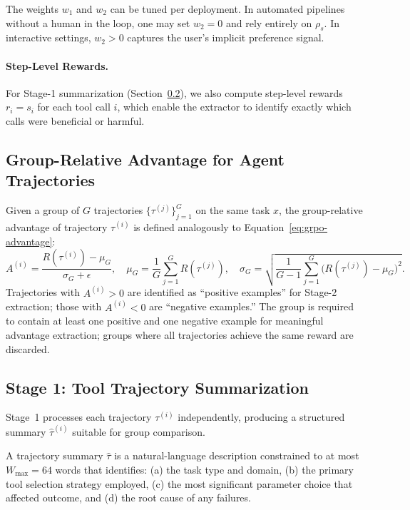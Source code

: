 \begin{remark}
The weights $w_1$ and $w_2$ can be tuned per deployment. In automated
pipelines without a human in the loop, one may set $w_2 = 0$ and rely
entirely on $\rho_s$. In interactive settings, $w_2 > 0$ captures the
user's implicit preference signal.
\end{remark}

\paragraph{Step-Level Rewards.}
For Stage-1 summarization (Section~\ref{sec:stage1}), we also compute step-level
rewards $r_i = s_i$ for each tool call $i$, which enable the extractor to
identify exactly which calls were beneficial or harmful.

\subsection{Group-Relative Advantage for Agent Trajectories}

Given a group of $G$ trajectories $\{\tau^{(j)}\}_{j=1}^G$ on the same task
$x$, the group-relative advantage of trajectory $\tau^{(i)}$ is defined
analogously to Equation~\eqref{eq:grpo-advantage}:
\begin{equation}
    A^{(i)} = \frac{R(\tau^{(i)}) - \mu_G}{\sigma_G + \epsilon},
    \quad \mu_G = \frac{1}{G}\sum_{j=1}^G R(\tau^{(j)}),
    \quad \sigma_G = \sqrt{\frac{1}{G-1}\sum_{j=1}^G \bigl(R(\tau^{(j)}) - \mu_G\bigr)^2}.
    \label{eq:agent-advantage}
\end{equation}
Trajectories with $A^{(i)} > 0$ are identified as ``positive examples'' for
Stage-2 extraction; those with $A^{(i)} < 0$ are ``negative examples.'' The
group is required to contain at least one positive and one negative example for
meaningful advantage extraction; groups where all trajectories achieve the same
reward are discarded.

\subsection{Stage 1: Tool Trajectory Summarization}
\label{sec:stage1}

Stage~1 processes each trajectory $\tau^{(i)}$ independently, producing a
structured summary $\hat{\tau}^{(i)}$ suitable for group comparison.

\begin{definition}
A trajectory summary $\hat{\tau}$ is a natural-language description constrained
to at most $W_{\max} = 64$ words that identifies: (a) the task type and domain,
(b) the primary tool selection strategy employed, (c) the most significant
parameter choice that affected outcome, and (d) the root cause of any failures.
\end{definition}


